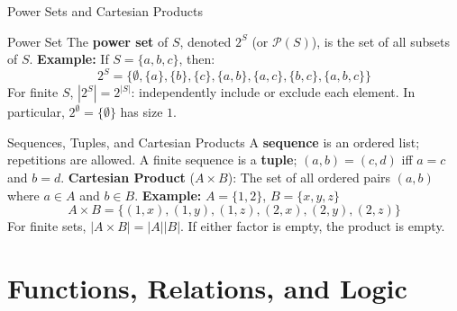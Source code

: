 \documentclass[10pt]{beamer}
\begin{document}
\begin{frame}{Power Sets and Cartesian Products}
  \small
  \begin{block}{Power Set}
    The \textbf{power set} of $S$, denoted $2^S$ (or $\mathcal{P}(S)$), is the set of all subsets of $S$.
    \newline \textbf{Example:} If $S = \{a, b, c\}$, then:
    $$2^S = \{\emptyset, \{a\}, \{b\}, \{c\}, \{a, b\}, \{a, c\}, \{b, c\}, \{a, b, c\}\}$$
    For finite $S$, $|2^S|=2^{|S|}$: independently include or exclude each
    element. In particular, $2^{\emptyset}=\{\emptyset\}$ has size $1$.
  \end{block}
  \pause
  \begin{block}{Sequences, Tuples, and Cartesian Products}
    A \textbf{sequence} is an ordered list; repetitions are allowed.
    A finite sequence is a \textbf{tuple}; $(a,b)=(c,d)$ iff $a=c$ and $b=d$.
    \newline \textbf{Cartesian Product} ($A \times B$): The set of all ordered pairs $(a, b)$ where $a \in A$ and $b \in B$.
    \newline \textbf{Example:} $A = \{1, 2\}$, $B = \{x, y, z\}$
    $$A \times B = \{(1, x), (1, y), (1, z), (2, x), (2, y), (2, z)\}$$
    For finite sets, $|A\times B|=|A||B|$. If either factor is empty,
    the product is empty.
  \end{block}
\end{frame}

\section{Functions, Relations, and Logic}
\end{document}
